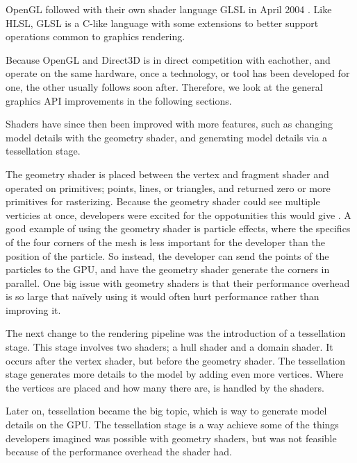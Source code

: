 OpenGL followed with their own shader language \gls{GLSL} in April 2004 \cite{wikipedia????opengl}. 
Like \gls{HLSL}, \gls{GLSL} is a C-like language with some extensions to better support operations common to graphics rendering.

\vspace{1em}

\noindent
Because OpenGL and Direct3D is in direct competition with eachother, and operate on the same hardware, once a technology, or tool has been developed for one, the other usually follows soon after.
Therefore, we look at the general graphics \gls{API} improvements in the following sections.

\vspace{1em}

\noindent
Shaders have since then been improved with more features, such as changing model details with the geometry shader, and generating model details via a tessellation stage.

The geometry shader is placed between the vertex and fragment shader and operated on primitives; points, lines, or triangles, and returned zero or more primitives for rasterizing.
Because the geometry shader could see multiple verticies at once, developers were excited for the oppotunities this would give \cite{kronos????geometry, microsoft????geometry}.
A good example of using the geometry shader is particle effects, where the specifics of the four corners of the mesh is less important for the developer than the position of the particle.
So instead, the developer can send the points of the particles to the \gls{GPU}, and have the geometry shader generate the corners in parallel.
One big issue with geometry shaders is that their performance overhead is so large that naïvely using it would often hurt performance rather than improving it.

The next change to the rendering pipeline was the introduction of a tessellation stage.
This stage involves two shaders; a hull shader and a domain shader.
It occurs after the vertex shader, but before the geometry shader.
The tessellation stage generates more details to the model by adding even more vertices.
Where the vertices are placed and how many there are, is handled by the shaders.

Later on, tessellation became the big topic, which is way to generate model details on the \gls{GPU}.
The tessellation stage is a way achieve some of the things developers imagined was possible with geometry shaders, but was not feasible because of the performance overhead the shader had.

